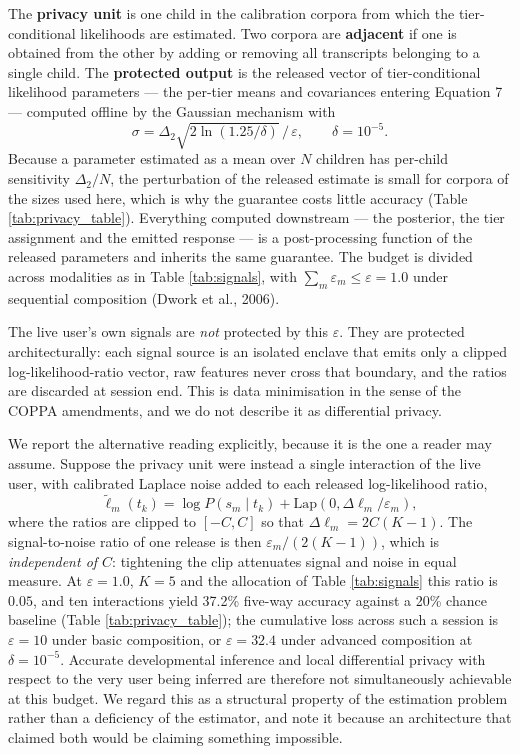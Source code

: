 \documentclass[fleqn,10pt]{wlscirep}
\begin{document}
The \textbf{privacy unit} is one child in the calibration corpora from which the tier-conditional likelihoods are estimated. Two corpora are \textbf{adjacent} if one is obtained from the other by adding or removing all transcripts belonging to a single child. The \textbf{protected output} is the released vector of tier-conditional likelihood parameters --- the per-tier means and covariances entering Equation 7 --- computed offline by the Gaussian mechanism with
\begin{equation}
\sigma = \Delta_2 \sqrt{2 \ln(1.25/\delta)} \, / \, \varepsilon , \qquad \delta = 10^{-5} .
\end{equation}
Because a parameter estimated as a mean over $N$ children has per-child sensitivity $\Delta_2 / N$, the perturbation of the released estimate is small for corpora of the sizes used here, which is why the guarantee costs little accuracy (Table \ref{tab:privacy_table}). Everything computed downstream --- the posterior, the tier assignment and the emitted response --- is a post-processing function of the released parameters and inherits the same guarantee. The budget is divided across modalities as in Table \ref{tab:signals}, with $\sum_m \varepsilon_m \leq \varepsilon = 1.0$ under sequential composition (Dwork et al., 2006)\cite{Dwork2006}.

The live user's own signals are \emph{not} protected by this $\varepsilon$. They are protected architecturally: each signal source is an isolated enclave that emits only a clipped log-likelihood-ratio vector, raw features never cross that boundary, and the ratios are discarded at session end. This is data minimisation in the sense of the COPPA amendments, and we do not describe it as differential privacy.

We report the alternative reading explicitly, because it is the one a reader may assume. Suppose the privacy unit were instead a single interaction of the live user, with calibrated Laplace noise added to each released log-likelihood ratio,
\begin{equation}
\tilde{\ell}_m(t_k) = \log P(s_m \mid t_k) + \text{Lap}(0, \Delta\ell_m / \varepsilon_m),
\end{equation}
where the ratios are clipped to $[-C, C]$ so that $\Delta \ell_m = 2C(K-1)$. The signal-to-noise ratio of one release is then $\varepsilon_m / (2(K-1))$, which is \emph{independent of $C$}: tightening the clip attenuates signal and noise in equal measure. At $\varepsilon = 1.0$, $K = 5$ and the allocation of Table \ref{tab:signals} this ratio is $0.05$, and ten interactions yield 37.2\% five-way accuracy against a 20\% chance baseline (Table \ref{tab:privacy_table}); the cumulative loss across such a session is $\varepsilon = 10$ under basic composition, or $\varepsilon = 32.4$ under advanced composition at $\delta = 10^{-5}$. Accurate developmental inference and local differential privacy with respect to the very user being inferred are therefore not simultaneously achievable at this budget. We regard this as a structural property of the estimation problem rather than a deficiency of the estimator, and note it because an architecture that claimed both would be claiming something impossible.
\end{document}
